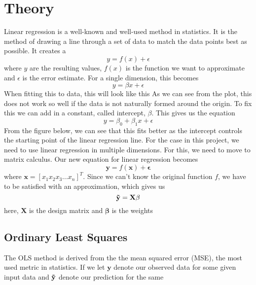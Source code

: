 \documentclass{article}
\begin{document}
\section{Theory}
Linear regression is a well-known and well-used method in statistics. It is the method of drawing a line through a set of data to match the data points best as possible. It creates a
\begin{equation*}
    y = f(x) + \epsilon
\end{equation*}
where $y$ are the resulting values, $f(x)$ is the function we want to approximate and $\epsilon$ is the error estimate. For a single dimension, this becomes
\begin{equation*}
    y = \beta x + \epsilon
\end{equation*}
When fitting this to data, this will look like this
As we can see from the plot, this does not work so well if the data is not naturally formed around the origin. To fix this we can add in a constant, called intercept, $\beta$. This gives us the equation
\begin{equation*}
    y = \beta_0 + \beta_1x + \epsilon
\end{equation*}
From the figure below, we can see that this fits better as the intercept controls the starting point of the linear regression line.
For the case in this project, we need to use linear regression in multiple dimensions. For this, we need to move to matrix calculus. Our new equation for linear regression becomes
\begin{equation*}
    \mathbf{y} = f(\mathbf{x}) + \mathbf{\epsilon}
\end{equation*}
where $\mathbf{x} = [x_1 x_2 x_3 ... x_n]^T$. Since we can't know the original function $f$, we have to be satisfied with an approximation, which gives us
\begin{equation*}
    \mathbf{\Tilde{y}} = \mathbf{X\beta}
\end{equation*}
here, $\mathbf{X}$ is the design matrix and $\mathbf{\beta}$ is the weights

\subsection{Ordinary Least Squares}
The OLS method is derived from the the mean squared error (MSE), the most used metric in statistics. If we let $\mathbf{y}$ denote our observed data for some given input data and $\mathbf{\Tilde{y}}$ denote our prediction for the same 
\end{document}
